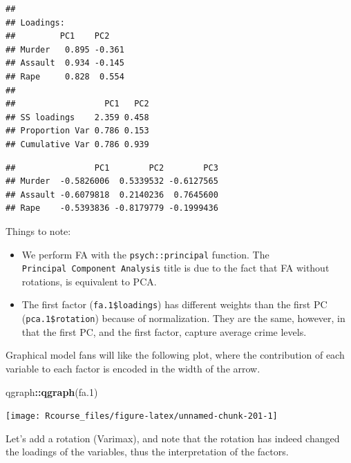 \documentclass[]{book}
\newenvironment{Shaded}{\begin{snugshade}}{\end{snugshade}}
\newcommand{\KeywordTok}[1]{\textcolor[rgb]{0.13,0.29,0.53}{\textbf{#1}}}
\newcommand{\DecValTok}[1]{\textcolor[rgb]{0.00,0.00,0.81}{#1}}
\newcommand{\OperatorTok}[1]{\textcolor[rgb]{0.81,0.36,0.00}{\textbf{#1}}}
\newcommand{\NormalTok}[1]{#1}
\providecommand{\tightlist}{%
  \setlength{\itemsep}{0pt}\setlength{\parskip}{0pt}}
\theoremstyle{definition}
\theoremstyle{definition}
\theoremstyle{definition}
\theoremstyle{remark}
\begin{document}
\begin{verbatim}
## 
## Loadings:
##         PC1    PC2   
## Murder   0.895 -0.361
## Assault  0.934 -0.145
## Rape     0.828  0.554
## 
##                  PC1   PC2
## SS loadings    2.359 0.458
## Proportion Var 0.786 0.153
## Cumulative Var 0.786 0.939
\end{verbatim}

\begin{Shaded}
\end{Shaded}

\begin{verbatim}
##                PC1        PC2        PC3
## Murder  -0.5826006  0.5339532 -0.6127565
## Assault -0.6079818  0.2140236  0.7645600
## Rape    -0.5393836 -0.8179779 -0.1999436
\end{verbatim}

Things to note:

\begin{itemize}
\tightlist
\item
  We perform FA with the \texttt{psych::principal} function. The
  \texttt{Principal\ Component\ Analysis} title is due to the fact that
  FA without rotations, is equivalent to PCA.
\item
  The first factor (\texttt{fa.1\$loadings}) has different weights than
  the first PC (\texttt{pca.1\$rotation}) because of normalization. They
  are the same, however, in that the first PC, and the first factor,
  capture average crime levels.
\end{itemize}

Graphical model fans will like the following plot, where the
contribution of each variable to each factor is encoded in the width of
the arrow.

\begin{Shaded}
\begin{Highlighting}[]
\NormalTok{qgraph}\OperatorTok{::}\KeywordTok{qgraph}\NormalTok{(fa.}\DecValTok{1}\NormalTok{)}
\end{Highlighting}
\end{Shaded}

\texttt{[image: Rcourse\_files/figure-latex/unnamed-chunk-201-1]}

Let's add a rotation (Varimax), and note that the rotation has indeed
changed the loadings of the variables, thus the interpretation of the
factors.
\end{document}
